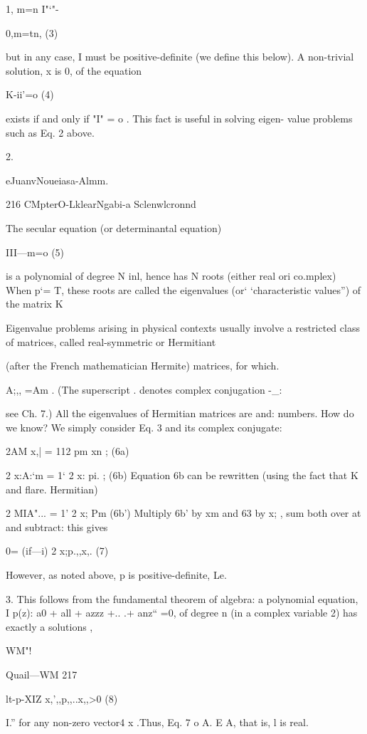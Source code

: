 1, m=n
I"‘"-{0,m=tn, (3)

but in any case, I must be positive-deﬁnite (we deﬁne this
below). A non-trivial solution, x is 0, of the equation

K-ii'=o (4)

exists if and only if "I" = o . This fact is useful in solving eigen-
value problems such as Eq. 2 above.

 

2.

eJuanvNoueiasa-Almm.

216 CMpterO-LklearNgabi-a Sclenwlcronnd

The secular equation (or determinantal equation)

III—m=o (5)

is a polynomial of degree N inl, hence has N roots (either real ori
co.mplex) When p‘= T, these roots are called the eigenvalues
(or‘ ‘characteristic values”) of the matrix K

Eigenvalue problems arising in physical contexts usually involve
a restricted class of matrices, called real-symmetric or Hermitiant

(after the French mathematician Hermite) matrices, for which.

A;,, =Am . (The superscript . denotes complex conjugation -_:

see Ch. 7.) All the eigenvalues of Hermitian matrices are and:
numbers. How do we know? We simply consider Eq. 3 and its
complex conjugate:

 

2AM x,| = 112 pm xn ; (6a)

2 x:A:‘m = 1‘ 2 x: pi. ; (6b)
Equation 6b can be rewritten (using the fact that K and ﬂare.
Hermitian)

2 MIA"... = 1' 2 x; Pm (6b')
Multiply 6b’ by xm and 63 by x; , sum both over at and subtract:
this gives

0= (if—i) 2 x;p.,,x,. (7)

However, as noted above, p is positive-deﬁnite, Le.

 

3. This follows from the fundamental theorem of algebra: a polynomial equation, I
p(z): a0 + all + azzz +.. .+ anz“ =0, of degree n (in a complex variable 2) has exactly a solutions ,

WM"!

Quail—WM 217

lt-p-XIZ x,’,,p,,..x,,>0 (8)

I.”
for any non-zero vector4 x .Thus, Eq. 7 o A. E A, that is, l is real.

}
